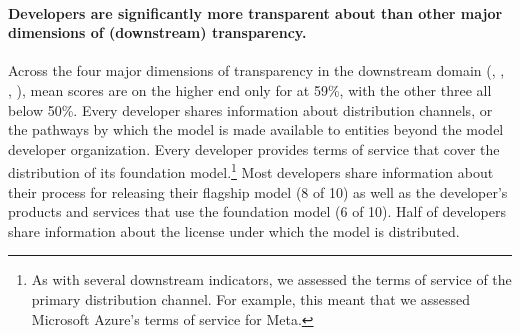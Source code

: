\paragraph{Developers are significantly more transparent about \distribution than other major dimensions of (downstream) transparency.}
Across the four major dimensions of transparency in the downstream domain (\distribution, \usagepolicy, \feedback, \impact), mean scores are on the higher end only for \distribution at 59\%, with the other three all below 50\%. 
Every developer shares information about distribution channels, or the pathways by which the model is made available to entities beyond the model developer organization.
Every developer provides terms of service that cover the distribution of its foundation model.\footnote{As with several downstream indicators, we assessed the terms of service of the primary distribution channel. For example, this meant that we assessed Microsoft Azure's terms of service for Meta.}
Most developers share information about their process for releasing their flagship model (8 of 10) as well as the developer's products and services that use the foundation model (6 of 10).
Half of developers share information about the license under which the model is distributed.

